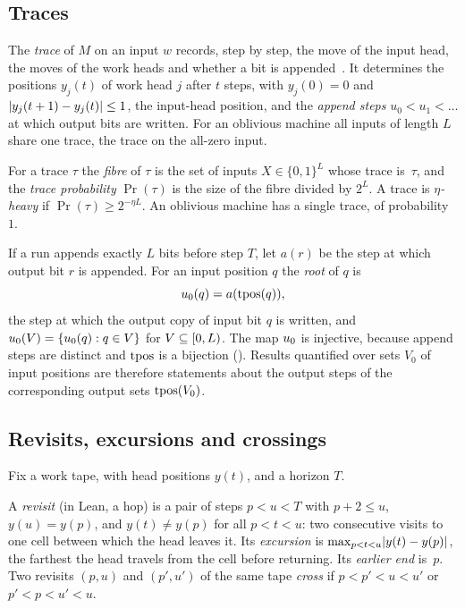 \subsection{Traces}

The \emph{trace} of $M$ on an input $w$ records, step by step, the move of the input head, the moves of the work heads and
whether a bit is appended~\cite{MergeDepth2026}. It determines the positions $y_j(t)$ of work head $j$ after $t$ steps, with
$y_j(0)=0$ and $\lvert y_j(t+1)-y_j(t) \rvert\le1$, the input-head position, and the \emph{append steps} $u_0<u_1<\dots$ at which output
bits are written. For an oblivious machine all inputs of length $L$ share one trace, the trace on the all-zero input.

For a trace $\tau$ the \emph{fibre} of $\tau$ is the set of inputs $X\in\{0,1\}^L$ whose trace is~$\tau$, and the \emph{trace
probability} $\Pr(\tau)$ is the size of the fibre divided by $2^L$. A trace is \emph{$\eta$-heavy} if $\Pr(\tau)\ge2^{-\eta L}$. An
oblivious machine has a single trace, of probability~$1$.

If a run appends exactly $L$ bits before step $T$, let $a(r)$ be the step at which output bit $r$ is appended. For an input
position $q$ the \emph{root} of $q$ is
\[
  u_0(q)=a(\mathrm{tpos}(q)),
\]
the step at which the output copy of input bit $q$ is written, and $u_0(V)=\{u_0(q):q\in V\}$ for $V\subseteq[0,L)$. The
map $u_0$ is injective, because append steps are distinct and $\mathrm{tpos}$ is a bijection
(). Results quantified over sets $V_0$ of input positions are therefore statements about the
output steps of the corresponding output sets $\mathrm{tpos}(V_0)$.

\subsection{Revisits, excursions and crossings}

Fix a work tape, with head positions $y(t)$, and a horizon $T$.

\begin{definition}[Revisits]\label{def:hop}
A \emph{revisit} (in Lean, a hop) is a pair of steps $p<u<T$ with $p+2\le u$, $y(u)=y(p)$, and $y(t)\ne y(p)$ for all $p<t<u$:
two consecutive visits to one cell between which the head leaves it. Its \emph{excursion} is
$\max_{p<t<u}\lvert y(t)-y(p) \rvert$, the farthest the head travels from the cell before returning. Its \emph{earlier end} is~$p$.
Two revisits $(p,u)$ and $(p',u')$ of the same tape \emph{cross} if $p<p'<u<u'$ or $p'<p<u'<u$.
\end{definition}

